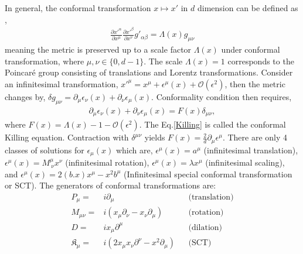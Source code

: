 \documentclass[%
 reprint,
superscriptaddress,
 amsmath,amssymb,
 aps,
]{revtex4-2}
\begin{document}
In general, the conformal transformation $x\longmapsto x'$ in $d$ dimension can be defined as \cite{Francesco,Blumenhagen}, 
\begin{align}
    \frac{\partial x'^{\alpha}}{\partial x^{\mu}}\frac{\partial x'^{\beta}}{\partial x^{\nu}}g'_{\alpha\beta}=\Lambda(x)g_{\mu\nu}
\end{align}
meaning the metric is preserved up to a scale factor $\Lambda(x)$ under conformal transformation, where $\mu,\nu\in\{0,d-1\}$. The scale $\Lambda(x)=1$ corresponds to the Poincar\'e group consisting of translations and Lorentz transformations. Consider an infinitesimal transformation, $x'^{\mu}=x^{\mu}+\epsilon^{\mu}(x)+\mathcal{O}(\epsilon^2)$, then the metric changes by, $\delta g_{\mu\nu}=\partial_{\mu}\epsilon_{\nu}(x)+\partial_{\nu}\epsilon_{\mu}(x)$. Conformality condition then requires, 
\begin{align}
    \partial_{\mu}\epsilon_{\nu}(x)+\partial_{\nu}\epsilon_{\mu}(x)=F(x)\delta_{\mu\nu},\label{Killing}
\end{align}
where $F(x)=\Lambda(x)-1-\mathcal{O}(\epsilon^2)$. The Eq.\eqref{Killing} is called the conformal Killing equation. Contraction with $\delta^{\mu\nu}$ yields $F(x)=\frac{2}{d}\partial_{\mu}\epsilon^{\mu}$. There are only 4 classes of solutions for $\epsilon_{\mu}(x)$ which are, $\epsilon^{\mu}(x)=a^{\mu}$ (infinitesimal translation), $\epsilon^{\mu}(x)=M^{\mu}_{~\nu}x^{\nu}$ (infinitesimal rotation), $\epsilon^{\mu}(x)=\lambda x^{\mu}$ (infinitesimal scaling), and $\epsilon^{\mu}(x)=2(b.x) x^{\mu}-x^2b^{\mu}$ (Infinitesimal special conformal transformation or SCT). The generators of conformal transformations are: 
\begin{align}
    P_{{\mu}}=&i\partial_{{\mu}}&& \text{(translation)}\\
    M_{{\mu}{\nu}}=&i\left(x_{{\mu}}\partial_{{\nu}}-x_{{\nu}}\partial_{{\mu}}\right)&& \text{(rotation)}\\
    D=&ix_{{\mu}}\partial^{{\mu}}&& \text{(dilation)}\\
    \mathfrak{K}_{{\mu}}=&i\left(2x_{{\mu}}x_{{\nu}}\partial^{{\nu}}-x^2\partial_{{\mu}}\right)&& \text{(SCT)}
\end{align}
\end{document}
